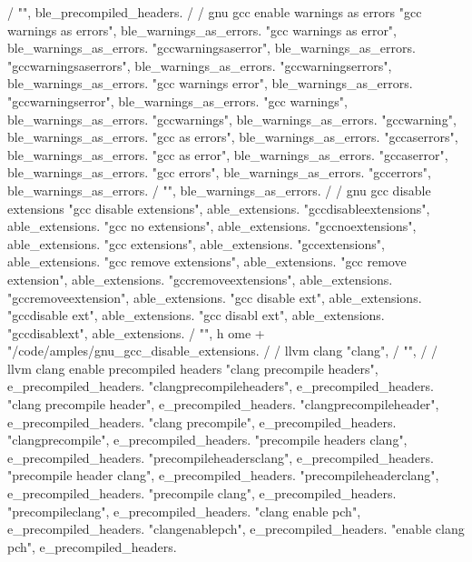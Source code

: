         / {"", ble_precompiled_headers.
        /
        / gnu gcc enable warnings as errors
        "gcc warnings as errors", ble_warnings_as_errors.
        "gcc warnings as error", ble_warnings_as_errors.
        "gccwarningsaserror", ble_warnings_as_errors.
        "gccwarningsaserrors", ble_warnings_as_errors.
        "gccwarningserrors", ble_warnings_as_errors.
        "gcc warnings error", ble_warnings_as_errors.
        "gccwarningserror", ble_warnings_as_errors.
        "gcc warnings", ble_warnings_as_errors.
        "gccwarnings", ble_warnings_as_errors.
        "gccwarning", ble_warnings_as_errors.
        "gcc as errors", ble_warnings_as_errors.
        "gccaserrors", ble_warnings_as_errors.
        "gcc as error", ble_warnings_as_errors.
        "gccaserror", ble_warnings_as_errors.
        "gcc errors", ble_warnings_as_errors.
        "gccerrors", ble_warnings_as_errors.
        / {"", ble_warnings_as_errors.
        /
        / gnu gcc disable extensions 
        "gcc disable extensions", able_extensions.
        "gccdisableextensions", able_extensions.
        "gcc no extensions", able_extensions.
        "gccnoextensions", able_extensions.
        "gcc extensions", able_extensions.
        "gccextensions", able_extensions.
        "gcc remove extensions", able_extensions.
        "gcc remove extension", able_extensions.
        "gccremoveextensions", able_extensions.
        "gccremoveextension", able_extensions.
        "gcc disable ext", able_extensions.
        "gccdisable ext", able_extensions.
        "gcc disabl ext", able_extensions.
        "gccdisablext", able_extensions.
        / {"", h ome + "/code/amples/gnu_gcc_disable_extensions.
        /
        / llvm clang 
        "clang",  
        / {"", 
        /
        / llvm clang enable precompiled headers 
        "clang precompile headers", e_precompiled_headers. 
        "clangprecompileheaders", e_precompiled_headers. 
        "clang precompile header", e_precompiled_headers. 
        "clangprecompileheader", e_precompiled_headers. 
        "clang precompile", e_precompiled_headers. 
        "clangprecompile", e_precompiled_headers. 
        "precompile headers clang", e_precompiled_headers. 
        "precompileheadersclang", e_precompiled_headers. 
        "precompile header clang", e_precompiled_headers. 
        "precompileheaderclang", e_precompiled_headers. 
        "precompile clang", e_precompiled_headers. 
        "precompileclang", e_precompiled_headers. 
        "clang enable pch", e_precompiled_headers. 
        "clangenablepch", e_precompiled_headers. 
        "enable clang pch", e_precompiled_headers. 
}}}}
